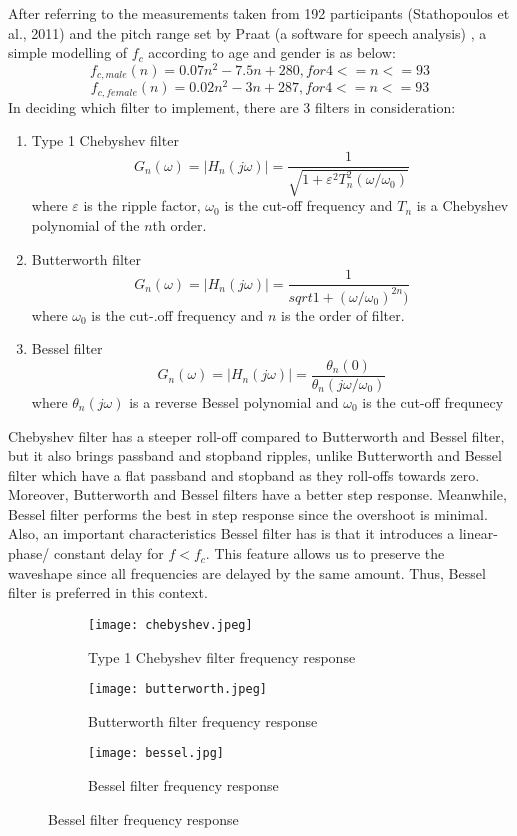 After referring to the measurements taken from 192 participants (Stathopoulos et al., 2011) and the pitch range
set by Praat (a software for speech analysis) \cite{praat}, a simple modelling of $f_c$ according to age and gender
is as below:
\[f_{c,male}(n) = 0.07n^2 - 7.5n + 280, for  4 <= n <= 93\]
\[f_{c,female}(n) = 0.02n^2 - 3n + 287, for  4 <= n <= 93\]
In deciding which filter to implement, there are 3 filters in consideration:
\begin{enumerate}[label=(\alph*)]
	\item Type 1 Chebyshev filter
	\[G_{n}(\omega) = |H_{n}(j\omega)| = {\frac{1}{\sqrt{1+\varepsilon^{2} T_{n}^{2}(\omega/\omega_{0})}}}\]
	where $\varepsilon$  is the ripple factor, $\omega _{0}$ is the cut-off frequency
	and $T_{n}$ is a Chebyshev polynomial of the $n$th order.
	\item Butterworth filter
	\[G_{n}(\omega) = |H_{n}(j\omega)| = {\frac{1}{sqrt{1+(\omega/\omega_{0})^{2n})}}}\]
	where $\omega _{0}$ is the cut-.off frequency and $n$ is the order of filter.
	\item Bessel filter
	\[G_{n}(\omega) = |H_{n}(j\omega)| ={\frac {\theta _{n}(0)}{\theta _{n}(j\omega/\omega _{0})}}\]
	where $\theta _{n}(j\omega)$ is a reverse Bessel polynomial and $\omega _{0}$ is the cut-off frequnecy
\end{enumerate}

Chebyshev filter has a steeper roll-off compared to Butterworth and Bessel filter, but it also brings passband and stopband ripples, 
unlike Butterworth and Bessel filter which have a flat passband and stopband as they roll-offs towards zero. Moreover, Butterworth 
and Bessel filters have a better step response. Meanwhile, Bessel filter performs the best in step response since the overshoot is
minimal. Also, an important characteristics Bessel filter has is that it introduces a linear-phase/ constant delay for $f<f_c$. This
feature allows us to preserve the waveshape since all frequencies are delayed by the same amount.
Thus, Bessel filter is preferred in this context.

\begin{figure}[h]
	\centering
	\begin{subfigure}{.32\textwidth}
	  	\centering
	  	\texttt{[image: chebyshev.jpeg]}
	  	\caption{Type 1 Chebyshev filter frequency response}
	  	\label{fig:sub1}
	\end{subfigure}%
	\begin{subfigure}{.32\textwidth}
	  	\centering
	  	\texttt{[image: butterworth.jpeg]}
	  	\caption{Butterworth filter frequency response}
	  	\label{fig:sub2}
	\end{subfigure}
	\begin{subfigure}{.32\textwidth}
		\centering
		\texttt{[image: bessel.jpg]}
		\caption{Bessel filter frequency response \cite{bessel}}
		\label{fig:sub3}
	\end{subfigure}
\end{figure}

